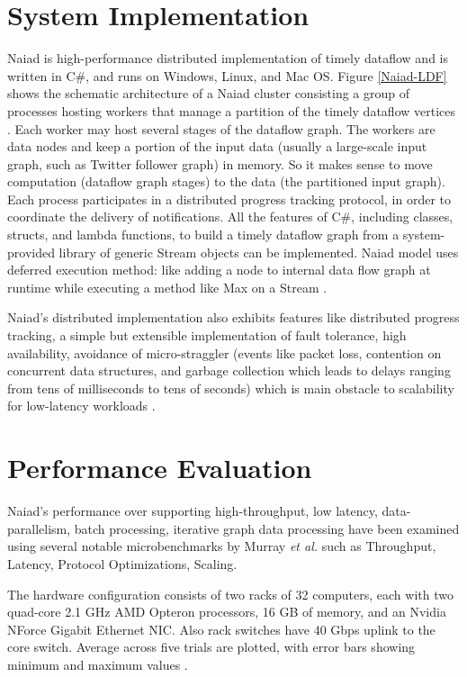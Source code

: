 \documentclass[9pt,twocolumn,twoside]{../../styles/osajnl}
\begin{document}
\section{System Implementation}
Naiad is high-performance distributed implementation of timely
dataflow and is written in C$\#$, and runs on Windows, Linux, and Mac
OS. Figure \ref{Naiad-LDF} shows the schematic architecture of a Naiad
cluster consisting a group of processes hosting workers that manage a
partition of the timely dataflow vertices \cite{paper3-Naiad}. Each
worker may host several stages of the dataflow graph. The workers are
data nodes and keep a portion of the input data (usually a large-scale
input graph, such as Twitter follower graph) in memory. So it makes
sense to move computation (dataflow graph stages) to the data (the
partitioned input
graph)\cite{www-informationage-blog-wordpress-naiad}. Each process
participates in a distributed progress tracking protocol, in order to
coordinate the delivery of notifications.  All the features of C$\#$,
including classes, structs, and lambda functions, to build a timely
dataflow graph from a system-provided library of generic Stream
objects can be implemented. Naiad model uses deferred execution
method: like adding a node to internal data flow graph at runtime
while executing a method like Max on a Stream \cite{paper1-Naiad}.

Naiad's distributed implementation also exhibits features like
distributed progress tracking, a simple but extensible implementation
of fault tolerance, high availability, avoidance of micro-straggler
(events like packet loss, contention on concurrent data structures,
and garbage collection which leads to delays ranging from tens of
milliseconds to tens of seconds) which is main obstacle to scalability
for low-latency workloads \cite{paper1-Naiad}.

\section{Performance Evaluation}
Naiad's performance over supporting high-throughput, low latency,
data-parallelism, batch processing, iterative graph data processing
have been examined using several notable microbenchmarks by Murray
\textit{et al.} \cite{paper1-Naiad} such as Throughput, Latency,
Protocol Optimizations, Scaling.

The hardware configuration consists of two racks of 32 computers, each
with two quad-core 2.1 GHz AMD Opteron processors, 16 GB of memory,
and an Nvidia NForce Gigabit Ethernet NIC. Also rack switches have 40
Gbps uplink to the core switch. Average across five trials are
plotted, with error bars showing minimum and maximum values
\cite{paper1-Naiad}.
\end{document}
